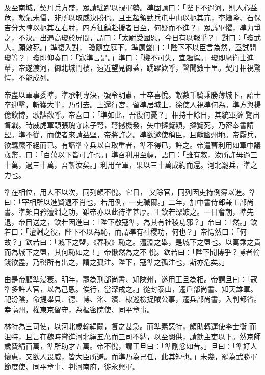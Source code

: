 \begin{pinyinscope}
 及至南城，契丹兵方盛，眾請駐蹕以覘軍勢。準固請曰：「陛下不過河，則人心益危，敵氣未懾，非所以取威決勝也。且王超領勁兵屯中山以扼其亢，李繼隆、石保吉分大陣以扼其左右肘，四方征鎮赴援者日至，何疑而不進？」眾議畢懼，準力爭之，不決。出遇高瓊於屏間，謂曰：「太尉受國恩，今日有以報乎？」對曰：「瓊武人，願效死。」準復入對，
 瓊隨立庭下，準厲聲曰：「陛下不以臣言為然，盍試問瓊等？」瓊即仰奏曰：「寇準言是。」準曰：「機不可失，宜趣駕。」瓊即麾衛士進輦，帝遂渡河，御北城門樓，遠近望見御蓋，踴躍歡呼，聲聞數十里。契丹相視驚愕，不能成列。



 帝盡以軍事委準，準承制專決，號令明肅，士卒喜悅。敵數千騎乘勝薄城下，詔士卒迎擊，斬獲大半，乃引去。上還行宮，留準居城上，徐使人視準何為。準方與楊億飲博，歌謔歡呼。帝喜曰：「準如此，吾復何憂？」相持十餘日，其統軍撻
 覽出督戰。時威虎軍頭張瑰守床子弩，弩撼機發，矢中撻覽額，撻覽死，乃密奉書請盟。準不從，而使者來請益堅，帝將許之。準欲邀使稱臣，且獻幽州地。帝厭兵，欲羈縻不絕而已。有譖準幸兵以自取重者，準不得已，許之。帝遣曹利用如軍中議歲幣，曰：「百萬以下皆可許也。」準召利用至幄，語曰：「雖有敕，汝所許毋過三十萬，過三十萬，吾斬汝矣。」利用至軍，果以三十萬成約而還。河北罷兵，準之力也。



 準在相位，用人不以次，同列頗不悅。它日，
 又除官，同列因吏持例簿以進。準曰：「宰相所以進賢退不肖也，若用例，一吏職爾。」二年，加中書侍郎兼工部尚書。準頗自矜澶淵之功，雖帝亦以此待準甚厚。王欽若深嫉之。一日會朝，準先退，帝目送之，欽若因進曰：「陛下敬寇準，為其有社稷功邪？」帝曰：「然。」欽若曰：「澶淵之役，陛下不以為恥，而謂準有社稷功，何也？」帝愕然曰：「何故？」欽若曰：「城下之盟，《春秋》恥之。澶淵之舉，是城下之盟也。以萬乘之貴而為城下之盟，其何恥如之！」帝愀然為之不
 悅。欽若曰：「陛下聞博乎？博者輸錢欲盡，乃罄所有出之，謂之孤注。陛下，寇準之孤注也，斯亦危矣。」



 由是帝顧準浸衰。明年，罷為刑部尚書、知陜州，遂用王旦為相。帝謂旦曰：「寇準多許人官，以為己恩。俟行，當深戒之。」從封泰山，遷戶部尚書、知天雄軍。祀汾陰，命提舉貝、德、博、洺、濱、棣巡檢捉賊公事，遷兵部尚書，入判都省。幸亳州，權東京留守，為樞密院使、同平章事。



 林特為三司使，以河北歲輸絹闕，督之甚急。而準素惡特，頗助轉運使李士衡
 而沮特，且言在魏時嘗進河北絹五萬而三司不納，以至闕供，請劾主吏以下。然京師歲費絹百萬，準所助才五萬。帝不悅，謂王旦曰：「準剛忿如昔。」旦曰：「準好人懷惠，又欲人畏威，皆大臣所避。而準乃為己任，此其短也。」未幾，罷為武勝軍節度使、同平章事、判河南府，徙永興軍。




\end{pinyinscope}
